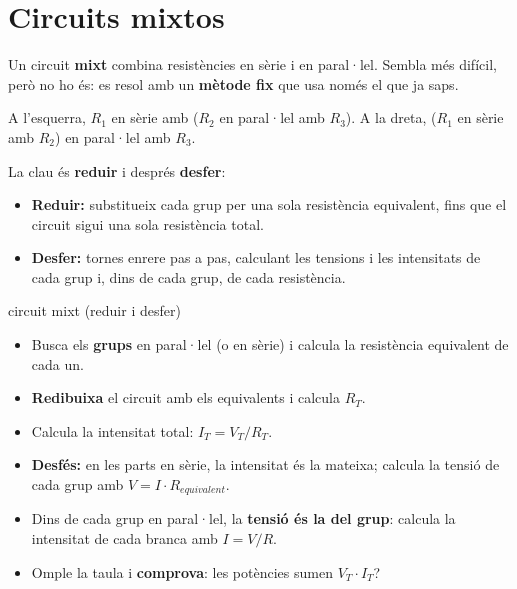 \section{Circuits mixtos}

Un circuit \textbf{mixt} combina resistències en sèrie i en paral·lel. Sembla més difícil, però no ho és: es resol amb un \textbf{mètode fix} que usa només el que ja saps.

\begin{center}
\qquad{}
\end{center}
\begin{center}\small A l'esquerra, $R_1$ en sèrie amb ($R_2$ en paral·lel amb $R_3$). A la dreta, ($R_1$ en sèrie amb $R_2$) en paral·lel amb $R_3$.\end{center}

\begin{idea}
La clau és \textbf{reduir} i després \textbf{desfer}:
\begin{itemize}
 \item \textbf{Reduir:} substitueix cada grup per una sola resistència equivalent, fins que el circuit sigui una sola resistència total.
 \item \textbf{Desfer:} tornes enrere pas a pas, calculant les tensions i les intensitats de cada grup i, dins de cada grup, de cada resistència.
\end{itemize}
\end{idea}

\begin{metode}{circuit mixt (reduir i desfer)}
\begin{itemize}
 \item \textbf{} Busca els \textbf{grups} en paral·lel (o en sèrie) i calcula la resistència equivalent de cada un. \quad
 \item \textbf{} \textbf{Redibuixa} el circuit amb els equivalents i calcula $R_T$. \quad
 \item \textbf{} Calcula la intensitat total: $I_T = V_T / R_T$. \quad
 \item \textbf{} \textbf{Desfés:} en les parts en sèrie, la intensitat és la mateixa; calcula la tensió de cada grup amb $V = I \cdot R_{equivalent}$. \quad
 \item \textbf{} Dins de cada grup en paral·lel, la \textbf{tensió és la del grup}: calcula la intensitat de cada branca amb $I = V / R$. \quad
 \item \textbf{} Omple la taula i \textbf{comprova}: les potències sumen $V_T \cdot I_T$?
\end{itemize}
\end{metode}

